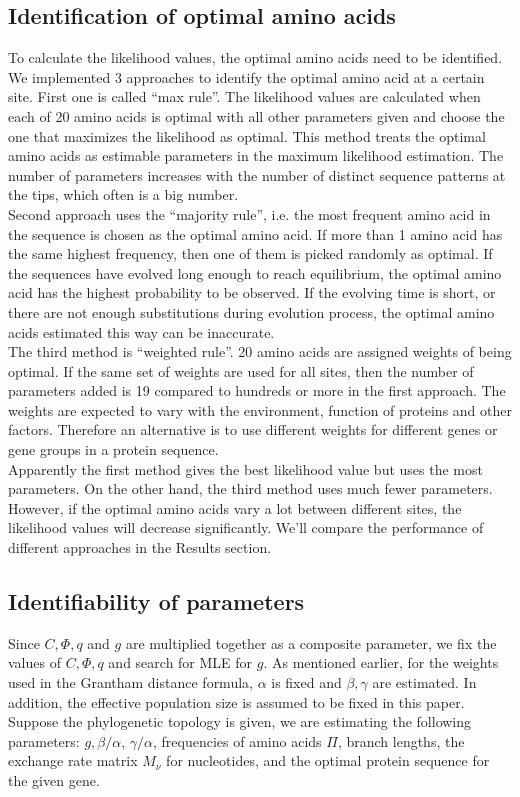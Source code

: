 \subsection{Identification of optimal amino acids}
To calculate the likelihood values, the optimal amino acids need to be identified.
We implemented 3 approaches to identify the optimal amino acid at a certain site.
First one is called ``max rule''.
The likelihood values are calculated when each of 20 amino acids is optimal with all other parameters given and choose the one that maximizes the likelihood as optimal.
This method treats the optimal amino acids as estimable parameters in the maximum likelihood estimation.
The number of parameters increases with the number of distinct sequence patterns at the tips, which often is a big number. \\
Second approach uses the ``majority rule'', i.e. the most frequent amino acid in the sequence is chosen as the optimal amino acid.
If more than 1 amino acid has the same highest frequency, then one of them is picked randomly as optimal.
If the sequences have evolved long enough to reach equilibrium, the optimal amino acid has the highest probability to be observed.
If the evolving time is short, or there are not enough substitutions during evolution process, the optimal amino acids estimated this way can be inaccurate. \\
The third method is ``weighted rule''. 20 amino acids are assigned weights of being optimal.
If the same set of weights are used for all sites, then the number of parameters added is 19 compared to hundreds or more in the first approach.
The weights are expected to vary with the environment, function of proteins and other factors.
Therefore an alternative is to use different weights for different genes or gene groups in a protein sequence. \\
Apparently the first method gives the best likelihood value but uses the most parameters.
On the other hand, the third method uses much fewer parameters.
However, if the optimal amino acids vary a lot between different sites, the likelihood values will decrease significantly.
We'll compare the performance of different approaches in the Results section.\\

\subsection{Identifiability of parameters}
Since $C, \Phi, q$ and $g$ are multiplied together as a composite parameter, we fix the values of $C, \Phi, q$ and search for MLE for $g$.
As mentioned earlier, for the weights used in the Grantham distance formula, $\alpha$ is fixed and $\beta, \gamma$ are estimated.
In addition, the effective population size is assumed to be fixed in this paper.
Suppose the phylogenetic topology is given, we are estimating the following parameters: $g, \beta/\alpha$, $\gamma/\alpha$, frequencies of amino acids $\Pi$, branch lengths, the exchange rate matrix $M_\nu$ for nucleotides, and the optimal protein sequence for the given gene. 